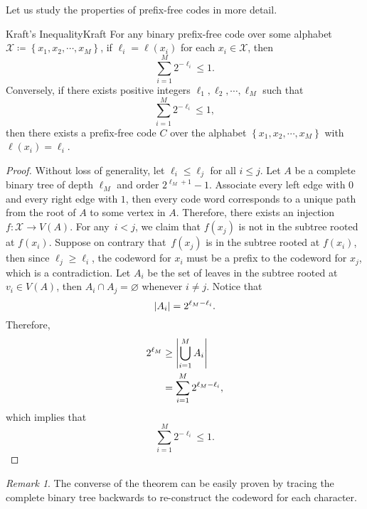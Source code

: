 \documentclass[math]{amznotes}
\theoremstyle{remark}
\newtheorem*{remark}{Remark}
\begin{document}
Let us study the properties of prefix-free codes in more detail.
\begin{thmbox}{Kraft's Inequality}{Kraft}
    For any binary prefix-free code over some alphabet $\mathcal{X} \coloneqq \left\{x_1, x_2, \cdots, x_M\right\}$, if $\ell_i = \ell\left(x_i\right)$ for each $x_i \in \mathcal{X}$, then 
    \begin{equation*}
        \sum_{i = 1}^{M}2^{-\ell_i} \leq 1.
    \end{equation*} 
    Conversely, if there exists positive integers $\ell_1, \ell_2, \cdots, \ell_{M}$ such that 
    \begin{equation*}
        \sum_{i = 1}^{M}2^{-\ell_i} \leq 1,
    \end{equation*}
    then there exists a prefix-free code $C$ over the alphabet $\left\{x_1, x_2, \cdots, x_M\right\}$ with $\ell\left(x_i\right) = \ell_i$.
    \tcblower
    \begin{proof}
        Without loss of generality, let $\ell_i \leq \ell_j$ for all $i \leq j$. Let $A$ be a complete binary tree of depth $\ell_M$ and order $2^{\ell_M + 1} - 1$. Associate every left edge with $0$ and every right edge with $1$, then every code word corresponds to a unique path from the root of $A$ to some vertex in $A$. Therefore, there exists an injection $f \colon \mathcal{X} \to V\left(A\right)$. For any~$i < j$, we claim that $f\left(x_j\right)$ is not in the subtree rooted at $f\left(x_i\right)$. Suppose on contrary that~$f\left(x_j\right)$ is in the subtree rooted at $f\left(x_i\right)$, then since $\ell_j \geq \ell_i$, the codeword for $x_i$ must be a prefix to the codeword for $x_j$, which is a contradiction. Let $A_i$ be the set of leaves in the subtree rooted at $v_i \in V\left(A\right)$, then $A_i \cap A_j = \varnothing$ whenever $i \neq j$. Notice that 
        \begin{equation*}
            {\left\lvert {A_i} \right\rvert} = 2^{\ell_M - \ell_i}.
        \end{equation*}
        Therefore, 
        \begin{align*}
            2^{\ell_M} & \geq {\left\lvert {\bigcup_{i = 1}^{M}A_i} \right\rvert} \\
            & = \sum_{i = 1}^{M}2^{\ell_M - \ell_i},
        \end{align*}
        which implies that 
        \begin{equation*}
            \sum_{i = 1}^{M}2^{-\ell_i} \leq 1.
        \end{equation*} 
    \end{proof}
\end{thmbox}
\begin{notebox}
    \begin{remark}
        The converse of the theorem can be easily proven by tracing the complete binary tree backwards to re-construct the codeword for each character.
    \end{remark}
\end{notebox}
\end{document}
